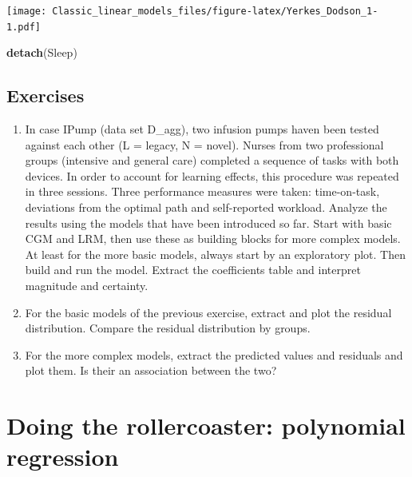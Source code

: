 \documentclass[]{svmono}
\newenvironment{Shaded}{\begin{snugshade}}{\end{snugshade}}
\newcommand{\KeywordTok}[1]{\textcolor[rgb]{0.13,0.29,0.53}{\textbf{#1}}}
\newcommand{\NormalTok}[1]{#1}
\theoremstyle{definition}
\theoremstyle{definition}
\theoremstyle{definition}
\theoremstyle{remark}
\begin{document}
\texttt{[image: Classic\_linear\_models\_files/figure-latex/Yerkes\_Dodson\_1-1.pdf]}

\begin{Shaded}
\begin{Highlighting}[]
\KeywordTok{detach}\NormalTok{(Sleep)}
\end{Highlighting}
\end{Shaded}

\subsection{Exercises}\label{exercises-5}

\begin{enumerate}
\def\labelenumi{\arabic{enumi}.}
\item
  In case IPump (data set D\_agg), two infusion pumps haven been tested
  against each other (L = legacy, N = novel). Nurses from two
  professional groups (intensive and general care) completed a sequence
  of tasks with both devices. In order to account for learning effects,
  this procedure was repeated in three sessions. Three performance
  measures were taken: time-on-task, deviations from the optimal path
  and self-reported workload. Analyze the results using the models that
  have been introduced so far. Start with basic CGM and LRM, then use
  these as building blocks for more complex models. At least for the
  more basic models, always start by an exploratory plot. Then build and
  run the model. Extract the coefficients table and interpret magnitude
  and certainty.
\item
  For the basic models of the previous exercise, extract and plot the
  residual distribution. Compare the residual distribution by groups.
\item
  For the more complex models, extract the predicted values and
  residuals and plot them. Is their an association between the two?
\end{enumerate}

\section{Doing the rollercoaster: polynomial
regression}\label{polynomial_regression}
\end{document}
